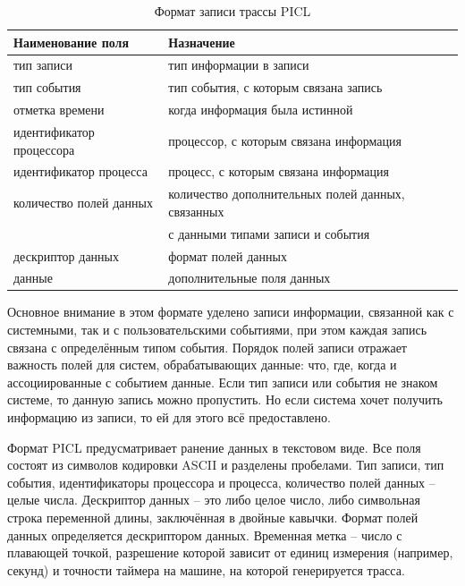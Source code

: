\begin{table}[h!]
	\caption{\label{tab:tbl1}Формат записи трассы PICL}
	\begin{tabular}{|l|l|}
		\hline
		Наименование поля & Назначение \\
		\hline\hline
		тип записи&тип информации в записи
		\\\hline
		тип события &тип события, с которым связана запись
		\\\hline
		отметка времени&когда информация была истинной\\\hline
		идентификатор процессора
		&процессор, с которым связана информация
		\\\hline
		идентификатор процесса	
		&процесс, с которым связана информация	
		\\\hline
		количество полей данных	
		&количество дополнительных полей данных, связанных \tabularnewline & с данными типами записи и события	
		\\\hline
		дескриптор данных	
		&формат полей данных
		\\\hline
		данные	
		&дополнительные поля данных
		\\\hline
		
	\end{tabular}
\end{table}
Основное внимание в этом формате уделено записи информации, связанной как с системными, так и с пользовательскими событиями, при этом каждая запись связана с определённым типом события. Порядок полей записи отражает важность полей для систем, обрабатывающих данные: что, где, когда и ассоциированные с событием данные. Если тип записи или события не знаком системе, то данную запись можно пропустить. Но если система хочет получить информацию из записи, то ей для этого всё предоставлено.

Формат PICL предусматривает ранение данных в текстовом виде. Все поля состоят из символов кодировки ASCII и разделены пробелами. Тип записи, тип события, идентификаторы процессора и процесса, количество полей данных – целые числа. Дескриптор данных – это либо целое число, либо символьная строка переменной длины, заключённая в двойные кавычки. Формат полей данных определяется дескриптором данных. Временная метка – число с плавающей точкой, разрешение которой зависит от единиц измерения (например, секунд) и точности таймера на машине, на которой генерируется трасса.

